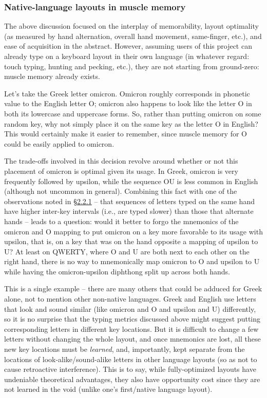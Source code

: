\documentclass[11pt]{article}
\begin{document}
\subsubsection{Native-language layouts in muscle memory}
\label{sec:org363ba4a}

The above discussion focused on the interplay of memorability, layout optimality (as measured by hand alternation, overall hand movement, same-finger, etc.), and ease of acquisition in the abstract. However, assuming users of this project can already type on a keyboard layout in their own language (in whatever regard: touch typing, hunting and pecking, etc.), they are not starting from ground-zero: muscle memory already exists.

Let's take the Greek letter omicron. Omicron roughly corresponds in phonetic value to the English letter O; omicron also happens to look like the letter O in both its lowercase and uppercase forms. So, rather than putting omicron on some random key, why not simply place it on the same key as the letter O in English? This would certainly make it easier to remember, since muscle memory for O could be easily applied to omicron.

The trade-offs involved in this decision revolve around whether or not this placement of omicron is optimal given its usage. In Greek, omicron is very frequently followed by upsilon, while the sequence OU is less common in English (although not uncommon in general).  Combining this fact with one of the observations noted in \hyperref[sec:org02f3267]{§2.2.1} -- that sequences of letters typed on the same hand have higher inter-key intervals (i.e., are typed slower) than those that alternate hands -- leads to a question: would it better to forgo the mnemonics of the omicron and O mapping to put omicron on a key more favorable to its usage with upsilon, that is, on a key that was on the hand opposite a mapping of upsilon to U? At least on QWERTY, where O and U are both next to each other on the right hand, there is no way to mnemonically map omicron to O and upsilon to U while having the omicron-upsilon diphthong split up across both hands.

This is a single example -- there are many others that could be adduced for Greek alone, not to mention other non-native languages. Greek and English use letters that look and sound similar (like omicron and O and upsilon and U) differently, so it is no surprise that the typing metrics discussed above might suggest putting corresponding letters in different key locations. But it is difficult to change a few letters without changing the whole layout, and once mnemonics are lost, all these new key locations must be \emph{learned}, and, importantly, kept separate from the locations of look-alike/sound-alike letters in other language layouts (so as not to cause retroactive interference). This is to say, while fully-optimized layouts have undeniable theoretical advantages, they also have opportunity cost since they are not learned in the void (unlike one's first/native language layout).
\end{document}
